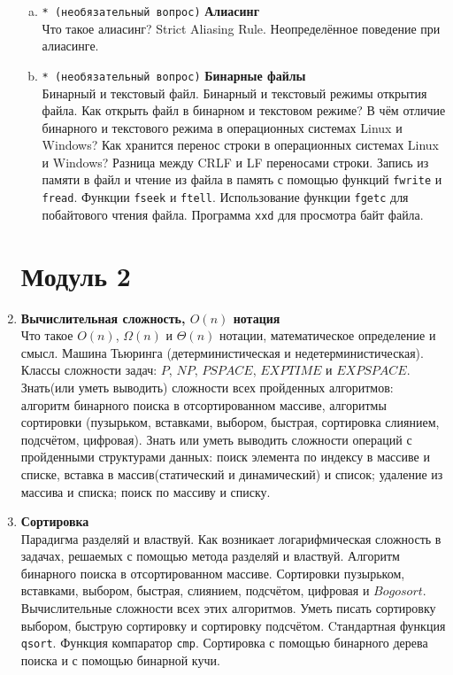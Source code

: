 \documentclass{article}
\begin{document}
\begin{enumerate}
\begin{enumerate}[a.]
\item \texttt{* (необязательный вопрос)} \textbf{Алиасинг}\\
Что такое алиасинг? Strict Aliasing Rule. Неопределённое поведение при алиасинге. 


\item \texttt{* (необязательный вопрос)} \textbf{Бинарные файлы}\\
Бинарный и текстовый файл. Бинарный и текстовый режимы открытия файла. Как открыть файл в бинарном и текстовом режиме? В чём отличие бинарного и текстового режима в операционных системах Linux и Windows? Как хранится перенос строки в операционных системах Linux и Windows? Разница между CRLF и LF переносами строки. Запись из памяти в файл и чтение из файла в память с помощью функций \texttt{fwrite} и \texttt{fread}. Функции \texttt{fseek} и \texttt{ftell}. Использование функции \texttt{fgetc} для побайтового чтения файла. Программа \texttt{xxd} для просмотра байт файла.
\end{enumerate}





\iffalse
\newpage
\section*{Модуль 2}
\item  \textbf{Вычислительная сложность, $O(n)$ нотация}\\
Что такое $O(n)$, $\Omega(n)$ и $\Theta(n)$ нотации, математическое определение и смысл. Машина Тьюринга (детерминистическая и недетерминистическая). Классы сложности задач: $P$, $NP$, $PSPACE$, $EXPTIME$ и $EXPSPACE$.
Знать(или уметь выводить) сложности всех пройденных алгоритмов: алгоритм бинарного поиска в отсортированном массиве, алгоритмы сортировки (пузырьком, вставками, выбором, быстрая, сортировка слиянием, подсчётом, цифровая). Знать или уметь выводить сложности операций с пройденными структурами данных: поиск элемента по индексу в массиве и списке, вставка в массив(статический и динамический) и список; удаление из массива и списка; поиск по массиву и списку.

\item \textbf{Сортировка}\\
Парадигма разделяй и властвуй. Как возникает логарифмическая сложность в задачах, решаемых с помощью метода разделяй и властвуй. Алгоритм бинарного поиска в отсортированном массиве.
Сортировки пузырьком, вставками, выбором, быстрая, слиянием, подсчётом, цифровая и $Bogosort$. Вычислительные сложности всех этих алгоритмов. Уметь писать сортировку выбором, быструю сортировку и сортировку подсчётом. Cтандартная функция \texttt{qsort}. Функция компаратор \texttt{cmp}. Сортировка с помощью бинарного дерева поиска и с помощью бинарной кучи.



\end{enumerate}
\end{document}
